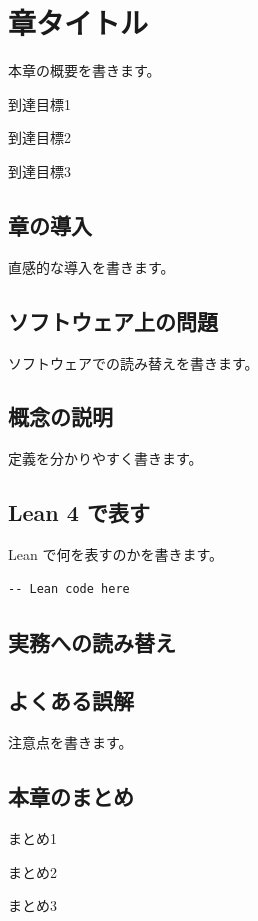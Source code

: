 \chapter{章タイトル}
\label{chap:chXX_slug}

\begin{chapterabstract}
本章の概要を書きます。
\end{chapterabstract}

\begin{learninggoals}
\item 到達目標1
\item 到達目標2
\item 到達目標3
\end{learninggoals}

\section{章の導入}

直感的な導入を書きます。


\section{ソフトウェア上の問題}

ソフトウェアでの読み替えを書きます。

\section{概念の説明}

定義を分かりやすく書きます。

\section{Lean 4 で表す}

Lean で何を表すのかを書きます。

\begin{listing}[htbp]
\begin{verbatim}
-- Lean code here
\end{verbatim}
\caption{Lean コード例}
\label{lst:chXX_sample}
\end{listing}

\section{実務への読み替え}

\section{よくある誤解}

注意点を書きます。

\section{本章のまとめ}

まとめ1

まとめ2

まとめ3
